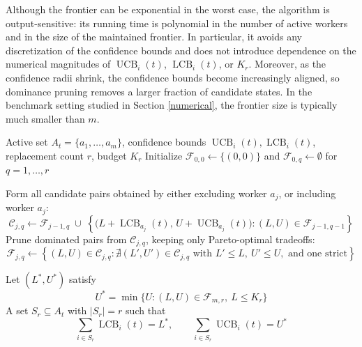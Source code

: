 \documentclass[opre,blindrev]{informs3}
\newcommand{\UCB}{\operatorname{UCB}}
\newcommand{\LCB}{\operatorname{LCB}}
\begin{document}
\begin{APPENDICES}
Although the frontier can be exponential in the worst case, the algorithm is output-sensitive: its running time is polynomial in the number of active workers and in the size of the maintained frontier. In particular, it avoids any discretization of the confidence bounds and does not introduce dependence on the numerical magnitudes of \(\UCB_i(t)\), \(\LCB_i(t)\), or \(K_r\). Moreover, as the confidence radii shrink, the confidence bounds become increasingly aligned, so dominance pruning removes a larger fraction of candidate states. In the benchmark setting studied in Section \ref{numerical}, the frontier size is typically much smaller than \(m\).

\begin{algorithm}
\caption{\textsc{FrontierConstrainedKnapsack}}
\label{alg:frontier-constrained-knapsack}
\begin{algorithmic}[1]
    \Require Active set \(A_t=\{a_1,\dots,a_m\}\), confidence bounds \(\UCB_i(t),\LCB_i(t)\), replacement count \(r\), budget \(K_r\)
    \State Initialize \(\mathcal{F}_{0,0}\gets \{(0,0)\}\) and \(\mathcal{F}_{0,q}\gets \emptyset\) for \(q=1,\dots,r\)

            \State Form all candidate pairs obtained by either
            excluding worker \(a_j\), or including worker \(a_j\):
            \[
                \mathcal{C}_{j,q}
                \gets
                \mathcal{F}_{j-1,q}
                \;\cup\;
                \left\{
                \bigl(L+\LCB_{a_j}(t),\,U+\UCB_{a_j}(t)\bigr)
                :
                (L,U)\in \mathcal{F}_{j-1,q-1}
                \right\}
            \]
            \State Prune dominated pairs from \(\mathcal{C}_{j,q}\), keeping only Pareto-optimal tradeoffs:
            \[
                \mathcal{F}_{j,q}
                \gets
                \left\{
                (L,U)\in\mathcal{C}_{j,q}:
                \nexists (L',U')\in\mathcal{C}_{j,q}
                \text{ with } L'\le L,\ U'\le U,
                \text{ and one strict}
                \right\}
            \]
        \EndFor
    \EndFor
    
    \State Let \((L^*,U^*)\) satisfy
    \[
        U^*=\min\{U:(L,U)\in\mathcal{F}_{m,r},\ L\le K_r\}
    \]
    \State \Return A set \(S_r\subseteq A_t\) with \(|S_r|=r\) such that
    \[
        \sum_{i\in S_r}\LCB_i(t)=L^*,
        \qquad
        \sum_{i\in S_r}\UCB_i(t)=U^*
    \]
\end{algorithmic}
\end{algorithm}


\end{APPENDICES}
\end{document}
